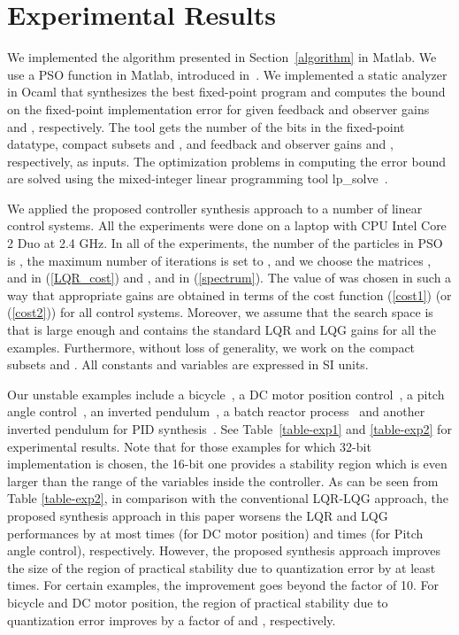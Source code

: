 \documentclass{amsart}
\numberwithin{equation}{section}
\begin{document}
\section{Experimental Results}
We implemented the algorithm presented in Section~\ref{algorithm} in Matlab. 
We use a PSO function in Matlab, introduced in~\cite{ebbesen}.
We implemented a static analyzer in Ocaml that synthesizes the best fixed-point program and computes the 
bound on the fixed-point implementation error for given feedback and observer gains  and , respectively. 
The tool gets the number of the bits in the fixed-point datatype, compact subsets  and , 
and feedback and observer gains  and , respectively, as inputs. 
The optimization problems in computing the error bound are solved using the mixed-integer linear programming tool {\sf lp\_solve}~\cite{lpsolve}. 

We applied the proposed controller synthesis approach to a number of linear control systems. 
All the experiments were done on a laptop with CPU Intel Core 2 Duo at 2.4 GHz. 
In all of the experiments, the number of the particles in PSO is , 
the maximum number of iterations is set to , 
and we choose the matrices , and  in (\ref{LQR_cost}) and , and  in (\ref{spectrum}). The value of  was chosen in such a way that appropriate gains are obtained in terms of the cost function (\ref{cost1}) (or (\ref{cost2})) for all control systems.
Moreover, we assume that the search space is  that is large enough and contains the standard LQR and LQG gains for all the examples. Furthermore, without loss of generality, we work on the compact subsets  and . All constants and variables are expressed in SI units. 

Our unstable examples include a bicycle~\cite{astrom}, a DC motor position control~\cite{cmu_examples}, a pitch angle control~\cite{cmu_examples}, an inverted pendulum~\cite{cmu_examples}, a batch reactor process~\cite{green} and another inverted pendulum for PID synthesis~\cite{cmu_examples}. See Table~\ref{table-exp1} and \ref{table-exp2} for experimental results. Note that for those examples for which 32-bit implementation is chosen, the 16-bit one provides a stability region which is even larger than the range of the variables inside the controller. As can be seen from Table \ref{table-exp2}, in comparison with the conventional LQR-LQG approach, the proposed synthesis approach in this paper worsens the LQR and LQG performances by at most  times (for
DC motor position) and  times (for Pitch angle control), respectively. 
However, the proposed synthesis approach improves the size of the region of practical stability due to quantization error by at least  times. For certain examples, the improvement goes beyond the factor of 10. For bicycle  and DC motor position, the region of practical stability due to quantization error improves by a factor of  and , respectively. 
\end{document}
